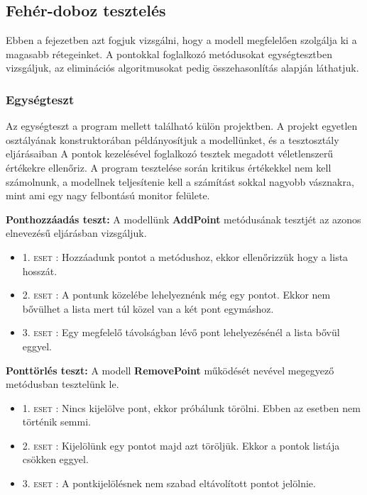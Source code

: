 			\subsection{Fehér-doboz tesztelés}
				Ebben a fejezetben azt fogjuk vizsgálni, hogy a modell megfelelően szolgálja ki a magasabb rétegeinket. A pontokkal foglalkozó metódusokat egységtesztben vizsgáljuk, az eliminációs algoritmusokat pedig összehasonlítás alapján láthatjuk. 
				
				\subsubsection{Egységteszt}
				
					Az egységteszt a program mellett található külön projektben. A projekt egyetlen osztályának konstruktorában példányosítjuk a modellünket, és a tesztosztály eljárásaiban  A pontok kezelésével foglalkozó tesztek megadott véletlenszerű értékekre ellenőriz. A program tesztelése során kritikus értékekkel nem kell számolnunk, a modellnek teljesítenie kell a számítást sokkal nagyobb vásznakra, mint ami egy nagy felbontású monitor felülete. 
					
					\textbf{Ponthozzáadás teszt:} A modellünk \textbf{AddPoint} metódusának tesztjét az azonos elnevezésű eljárásban vizsgáljuk.
					\begin{itemize}
						\item \textsc{1. eset :} Hozzáadunk pontot a metódushoz, ekkor ellenőrizzük hogy a lista hosszát.
						\item \textsc{2. eset :} A pontunk közelébe lehelyeznénk még egy pontot. Ekkor nem bővülhet a lista mert túl közel van a két pont egymáshoz. 
						\item \textsc{3. eset :} Egy megfelelő távolságban lévő pont lehelyezésénél a lista bővül eggyel. 
					\end{itemize}  
				
					\textbf{Ponttörlés teszt:} A modell \textbf{RemovePoint} működését nevével megegyező metódusban tesztelünk le.
					\begin{itemize}
						\item \textsc{1. eset :} Nincs kijelölve pont, ekkor próbálunk törölni. Ebben az esetben nem történik semmi.
						\item \textsc{2. eset :} Kijelölünk egy pontot majd azt töröljük. Ekkor a pontok listája csökken eggyel.
						\item \textsc{3. eset :} A pontkijelölésnek nem szabad eltávolított pontot jelölnie.  
					\end{itemize} 
				
